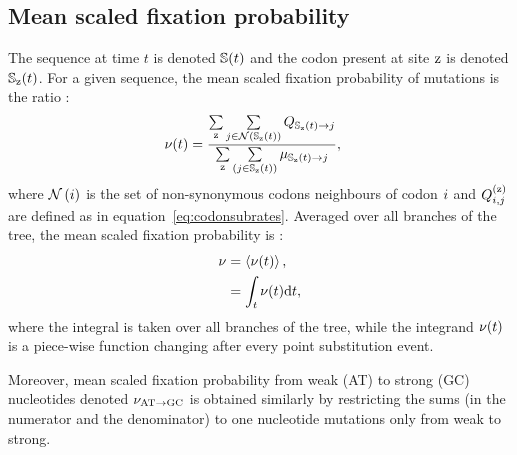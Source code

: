 \subsection{Mean scaled fixation probability}
\label{subsec:fixation-bias}
The sequence at time $t$ is denoted $\mathbb{S}(t)$ and the codon present at site $\text{z}$ is denoted $\mathbb{S}_{\text{z}}(t)$.
For a given sequence, the mean scaled fixation probability of mutations is the ratio :
\begin{align}
    \nu (t) & = \dfrac{ \sum\limits_{\text{z}} \sum\limits_{{j} \in \mathcal{N} \left ( \mathbb{S}_{\text{z}}(t) \right)} Q_{\mathbb{S}_{\text{z}}(t) \to {j}}}{ \sum\limits_{\text{z}} \sum\limits_{\left ( {j} \in \mathbb{S}_{\text{z}}(t) \right)} \mu_{\mathbb{S}_{\text{z}}(t) \to {j}}},
\end{align}
where $\mathcal{N}\left({i}\right)$ is the set of non-synonymous codons neighbours of codon ${i}$ and $Q_{{i}, {j}}^{(\text{z})}$ are defined as in equation~\ref{eq:codonsubrates}.
Averaged over all branches of the tree, the mean scaled fixation probability is :
\begin{align}
    \nu & = \left\langle \nu (t) \right\rangle, \\
    & = \int_{t} \nu (t) \text{d} t,
\end{align}
where the integral is taken over all branches of the tree, while the integrand $\nu (t)$ is a piece-wise function changing after every point substitution event.

Moreover, mean scaled fixation probability from weak (AT) to strong (GC) nucleotides denoted $\nu_{\text{AT} \rightarrow \text{GC}}$ is obtained similarly by restricting the sums (in the numerator and the denominator) to one nucleotide mutations only from weak to strong.

